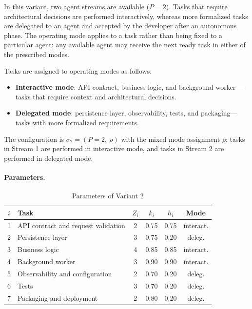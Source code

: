 
In this variant, two agent streams are available ($P = 2$). Tasks that require
architectural decisions are performed interactively, whereas more formalized
tasks are delegated to an agent and accepted by the developer after an
autonomous phase. The operating mode applies to a task rather than being fixed
to a particular agent: any available agent may receive the next ready task in
either of the prescribed modes.

Tasks are assigned to operating modes as follows:
\begin{itemize}
  \item \textbf{Interactive mode}: API contract, business logic, and background
  worker---tasks that require context and architectural decisions.
  \item \textbf{Delegated mode}: persistence layer, observability, tests, and
  packaging---tasks with more formalized requirements.
\end{itemize}

The configuration is $\sigma_2 = (P{=}2,\ \rho)$ with the mixed mode assignment
$\rho$: tasks in Stream 1 are performed in interactive mode, and tasks in
Stream 2 are performed in delegated mode.

\paragraph{Parameters.}
\begin{table}[ht!]
\centering
\caption{Parameters of Variant 2}
\label{tab:practical-v2-params}
\begin{tabular}{clcccc}
\toprule
$i$ & Task & $Z_i$ & $k_i$ & $h_i$ & Mode \\
\midrule
1 & API contract and request validation & 2 & 0.75 & 0.75 & interact. \\
2 & Persistence layer & 3 & 0.75 & 0.20 & deleg. \\
3 & Business logic & 4 & 0.85 & 0.85 & interact. \\
4 & Background worker & 3 & 0.90 & 0.90 & interact. \\
5 & Observability and configuration & 2 & 0.70 & 0.20 & deleg. \\
6 & Tests & 3 & 0.70 & 0.20 & deleg. \\
7 & Packaging and deployment & 2 & 0.80 & 0.20 & deleg. \\
\bottomrule
\end{tabular}
\end{table}

